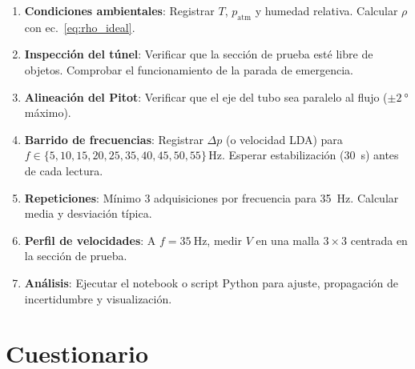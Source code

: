\documentclass[12pt,a4paper]{article}
\begin{document}
\begin{enumerate}
	\item \textbf{Condiciones ambientales}: Registrar $T$, $p_\mathrm{atm}$ y
	      humedad relativa.  Calcular $\rho$ con ec.~\eqref{eq:rho_ideal}.
	\item \textbf{Inspección del túnel}: Verificar que la sección de prueba esté
	      libre de objetos.  Comprobar el funcionamiento de la parada de
	      emergencia.
	\item \textbf{Alineación del Pitot}: Verificar que el eje del tubo sea
	      paralelo al flujo ($\pm\SI{2}{\degree}$ máximo).
	\item \textbf{Barrido de frecuencias}: Registrar $\Delta p$ (o velocidad LDA)
	      para $f \in \{5, 10, 15, 20, 25, 35, 40, 45, 50, 55\}\,\si{\Hz}$.
	      Esperar estabilización (\SI{30}{\second}) antes de cada lectura.
	\item \textbf{Repeticiones}: Mínimo 3 adquisiciones por frecuencia para
	      35~Hz.  Calcular media y desviación típica.
	\item \textbf{Perfil de velocidades}: A $f = \SI{35}{\Hz}$, medir $V$
	      en una malla $3\times3$ centrada en la sección de prueba.
	\item \textbf{Análisis}: Ejecutar el notebook o script Python para ajuste,
	      propagación de incertidumbre y visualización.
\end{enumerate}

\section{Cuestionario}
\label{sec:cuestionario}
\end{document}

